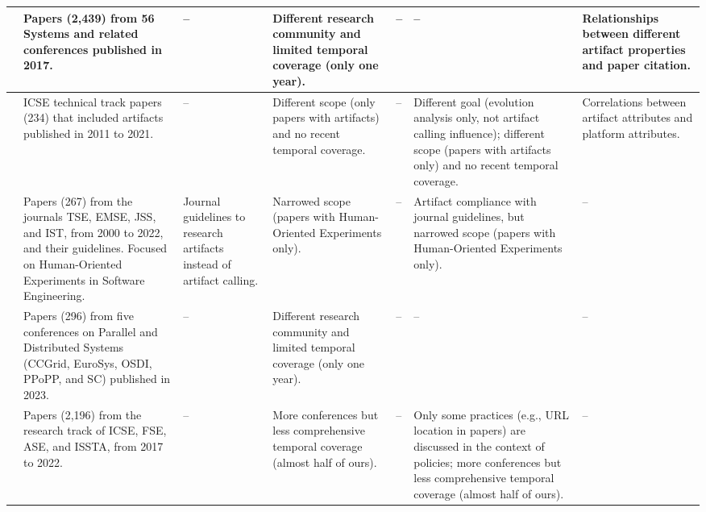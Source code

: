 \begin{landscape}
\begin{longtable}{@{} p{24mm} p{40mm} p{29mm} p{30mm} p{30mm} p{38mm} p{28mm} @{}}
\midrule


\cite{Frachtenberg2022} &
Papers (2,439) from 56 Systems and related conferences published in 2017. &
-- &
Different research community and limited temporal coverage (only one year). &
-- &
-- &
Relationships between different artifact properties and paper citation. \\
\midrule

\cite{AhmedOrtizEisty2024} &
ICSE technical track papers (234) that included artifacts published in 2011 to 2021. &
-- &
Different scope (only papers with artifacts) and no recent temporal coverage. &
-- &
Different goal (evolution analysis only, not artifact calling influence); different scope (papers with artifacts only) and no recent temporal coverage. &
Correlations between artifact attributes and platform attributes.\\
\midrule



\cite{GuevaraVegaEtAl2024} &
Papers (267) from the journals TSE, EMSE, JSS, and IST, from 2000 to 2022, and their guidelines. Focused on Human-Oriented Experiments in Software Engineering. &
Journal guidelines to research artifacts instead of artifact calling. &
Narrowed scope (papers with Human-Oriented Experiments only). &
-- &
Artifact compliance with journal guidelines, but narrowed scope (papers with Human-Oriented Experiments only). &
-- \\
\midrule



\cite{GuilloteauEtAl2024} &
Papers (296) from five conferences on Parallel and Distributed Systems (CCGrid, EuroSys, OSDI, PPoPP, and SC) published in 2023. &
-- & 
Different research community and limited temporal coverage (only one year). &
-- &
-- &
-- \\
\midrule



\cite{LiuEtAl2024} &
Papers (2,196) from the research track of ICSE, FSE, ASE, and ISSTA, from 2017 to 2022. &
-- &
More conferences but less comprehensive temporal coverage (almost half of ours). &
-- &
Only some practices (e.g., URL location in papers) are discussed in the context of policies; more conferences but less comprehensive temporal coverage (almost half of ours). &
-- \\
\bottomrule

\end{longtable}

\footnotesize



\end{landscape}



